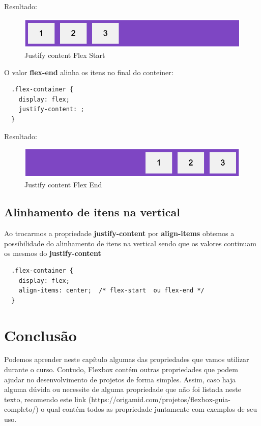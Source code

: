 Resultado: 

\begin{figure}[H]
  \centering
  \includegraphics[scale=0.4]{imagens/justify-content-flex-start.png}
  \caption{Justify content Flex Start}
  \label{fig:model-flexbox}
\end{figure}

O valor \textbf{flex-end} alinha os itens no final do conteiner:

\begin{lstlisting}
  .flex-container {
    display: flex;
    justify-content: ;
  } 
\end{lstlisting}

Resultado: 

\begin{figure}[H]
  \centering
  \includegraphics[scale=0.4]{imagens/justify-content-flex-end.png}
  \caption{Justify content Flex End}
  \label{fig:model-flexbox}
\end{figure}

\subsection{Alinhamento de itens na vertical}

Ao trocarmos a propriedade \textbf{justify-content} por \textbf{align-items} obtemos a possibilidade do alinhamento de itens na vertical sendo que os valores continuam os mesmos do \textbf{justify-content}

\begin{lstlisting}
  .flex-container {
    display: flex;
    align-items: center;  /* flex-start  ou flex-end */
  } 
\end{lstlisting}

\section{Conclusão}

Podemos aprender neste capítulo algumas das propriedades que vamos utilizar durante o curso. Contudo, Flexbox contém outras propriedades que podem ajudar no desenvolvimento de projetos de forma simples. Assim, caso haja alguma dúvida ou necessite de alguma propriedade que não foi listada neste texto, recomendo este link (https://origamid.com/projetos/flexbox-guia-completo/) o qual contém todos as  propriedade juntamente com exemplos de seu uso.
